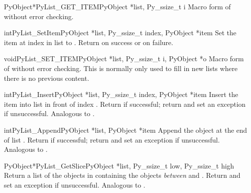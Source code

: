 \begin{cfuncdesc}{PyObject*}{PyList_GET_ITEM}{PyObject *list, Py_ssize_t i}
  Macro form of  without error checking.
\end{cfuncdesc}

\begin{cfuncdesc}{int}{PyList_SetItem}{PyObject *list, Py_ssize_t index,
                                       PyObject *item}
  Set the item at index  in list to .  Return
   on success or  on failure.  
\end{cfuncdesc}

\begin{cfuncdesc}{void}{PyList_SET_ITEM}{PyObject *list, Py_ssize_t i,
                                              PyObject *o}
  Macro form of  without error checking.
  This is normally only used to fill in new lists where there is no
  previous content.
\end{cfuncdesc}

\begin{cfuncdesc}{int}{PyList_Insert}{PyObject *list, Py_ssize_t index,
                                      PyObject *item}
  Insert the item  into list  in front of index
  .  Return  if successful; return  and
  set an exception if unsuccessful.  Analogous to
  .
\end{cfuncdesc}

\begin{cfuncdesc}{int}{PyList_Append}{PyObject *list, PyObject *item}
  Append the object  at the end of list .
  Return  if successful; return  and set an
  exception if unsuccessful.  Analogous to
  .
\end{cfuncdesc}

\begin{cfuncdesc}{PyObject*}{PyList_GetSlice}{PyObject *list,
                                              Py_ssize_t low, Py_ssize_t high}
  Return a list of the objects in  containing the objects
  \emph{between}  and .  Return \NULL{} and set
  an exception if unsuccessful.
  Analogous to .
\end{cfuncdesc}

